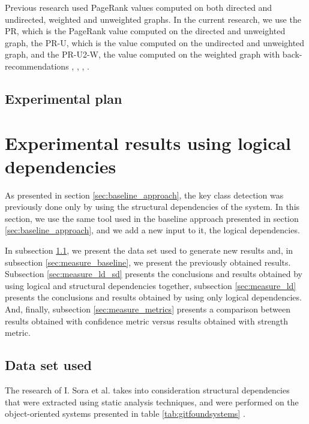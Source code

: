 \documentclass[runningheads]{comsis2}
\begin{document}
Previous research used PageRank values computed on both directed and undirected, weighted and unweighted graphs. In the current research, we use the PR, which is the PageRank value computed on the directed and unweighted graph, the PR-U, which is the value computed on the undirected and unweighted graph, and the PR-U2-W, the value computed on the weighted graph with back-recommendations \cite{PagerankENASE}, \cite{enase15}, \cite{Finding-key-classes}, \cite{PagerankSACI}.


\subsection{Experimental plan}
\label{sec:plan}

\section{Experimental results using logical dependencies}
\label{sec:current_measurements}


As presented in section \ref{sec:baseline_approach}, the key class detection was previously done only by using the structural dependencies of the system. 
In this section, we use the same tool used in the baseline approach presented in section \ref{sec:baseline_approach}, and we add a new input to it, the logical dependencies. 

In subsection \ref{sec:dataset}, we present the data set used to generate new results and, in subsection \ref{sec:measure_baseline}, we present the previously obtained results. Subsection \ref{sec:measure_ld_sd} presents the conclusions and results obtained by using logical and structural dependencies together, subsection \ref{sec:measure_ld} presents the conclusions and results obtained by using only logical dependencies. And, finally, subsection \ref{sec:measure_metrics} presents a comparison between results obtained with confidence metric versus results obtained with strength metric.



\subsection{Data set used}
\label{sec:dataset}


The research of I. Sora et al. takes into consideration structural dependencies that were extracted using static analysis techniques, and were performed on the object-oriented systems presented in table \ref{tab:gitfoundsystems} \cite{Finding-key-classes}.
\end{document}
